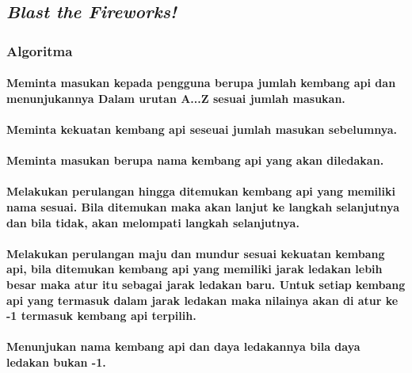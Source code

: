 \documentclass{subfiles}
\begin{document}
\subsection{\textit{Blast the Fireworks!}}
\subsubsection{Algoritma}
\paragraph{Meminta masukan kepada pengguna berupa jumlah kembang api dan menunjukannya
            Dalam urutan A...Z sesuai jumlah masukan.}
\paragraph{Meminta kekuatan kembang api seseuai jumlah masukan sebelumnya.}
\paragraph{Meminta masukan berupa nama kembang api yang akan diledakan.}
\paragraph{Melakukan perulangan hingga ditemukan kembang api yang memiliki nama sesuai.
            Bila ditemukan maka akan lanjut ke langkah selanjutnya dan bila tidak, akan
            melompati langkah selanjutnya.}
\paragraph{Melakukan perulangan maju dan mundur sesuai kekuatan kembang api,
            bila ditemukan kembang api yang memiliki jarak ledakan lebih besar maka atur itu
            sebagai jarak ledakan baru. Untuk setiap kembang api yang termasuk dalam jarak
            ledakan maka nilainya akan di atur ke -1 termasuk kembang api terpilih.}
\paragraph{Menunjukan nama kembang api dan daya ledakannya bila daya ledakan bukan -1.}
\newpage
\subsubsection{\Flowchart}
\vspace{-0.3ex}
\end{document}
